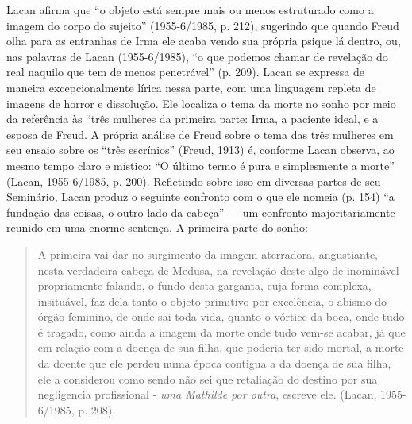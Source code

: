 Lacan afirma que ``o objeto está sempre mais ou menos estruturado como a
imagem do corpo do sujeito'' (1955-6/1985, p. 212), sugerindo que quando
Freud olha para as entranhas de Irma ele acaba vendo sua própria psique
lá dentro, ou, nas palavras de Lacan (1955-6/1985), ``o que podemos
chamar de revelação do real naquilo que tem de menos penetrável'' (p.
209). Lacan se expressa de maneira excepcionalmente lírica nessa parte,
com uma linguagem repleta de imagens de horror e dissolução. Ele
localiza o tema da morte no sonho por meio da referência às ``três
mulheres da primeira parte: Irma, a paciente ideal, e a esposa de Freud.
A própria análise de Freud sobre o tema das três mulheres em seu ensaio
sobre os ``três escrínios'' (Freud, 1913) é, conforme Lacan observa, ao
mesmo tempo claro e místico: ``O último termo é pura e simplesmente a
morte'' (Lacan, 1955-6/1985, p. 200). Refletindo sobre isso em diversas
partes de seu Seminário, Lacan produz o seguinte confronto com o que ele
nomeia (p. 154) ``a fundação das coisas, o outro lado da cabeça'' --- um
confronto majoritariamente reunido em uma enorme sentença. A primeira
parte do sonho:

\begin{quote}
A primeira vai dar no surgimento da imagem aterradora, angustiante,
nesta verdadeira cabeça de Medusa, na revelação deste algo de inominável
propriamente falando, o fundo desta garganta, cuja forma complexa,
insituável, faz dela tanto o objeto primitivo por excelência, o abismo
do órgão feminino, de onde sai toda vida, quanto o vórtice da boca, onde
tudo é tragado, como ainda a imagem da morte onde tudo vem-se acabar, já
que em relação com a doença de sua filha, que poderia ter sido mortal, a
morte da doente que ele perdeu numa época contigua a da doença de sua
filha, ele a considerou como sendo não sei que retaliação do destino por
sua negligencia profissional - \emph{uma Mathilde por outra}, escreve
ele. (Lacan, 1955-6/1985, p. 208).
\end{quote}

